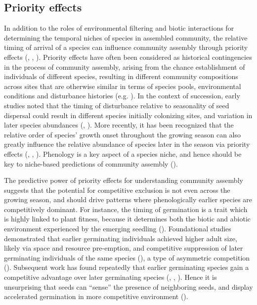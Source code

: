 \documentclass[11pt]{article}
\begin{document}
\subsection*{Priority effects}

In addition to the roles of environmental filtering and biotic interactions for determining the temporal niches of species in assembled community, the relative timing of arrival of a species can influence community assembly through priority effects (\citet{alford1985priority}, \citet{chase2003community}, \citet{fukami2015historical}). Priority effects have often been considered as historical contingencies in the process of community assembly, arising from the chance establishment of individuals of different species, resulting in different community compositions across sites that are otherwise similar in terms of species pools, environmental conditions and disturbance histories (e.g. \citet{diamond1975assembly}). In the context of succession, early studies noted that the timing of disturbance relative to seasonality of seed dispersal could result in different species initially colonizing sites, and variation in later species abundances (\citet{keever1950causes}, \citet{holt1972effect}). More recently, it has been recognized that the relative order of species’ growth onset throughout the growing season can also greatly influence the relative abundance of species later in the season via priority effects (\citet{fukami2015historical}, \citet{wainwright2012seasonal}, \citet{rudolf2019role}).  Phenology is a key aspect of a species niche, and hence should be key to niche-based predictions of community assembly (\citet{vannette2014historical}).

The predictive power of priority effects for understanding community assembly suggests that the potential for competitive exclusion is not even across the growing season, and should drive patterns where phenologically earlier species are competitively dominant. For instance, the timing of germination is a trait which is highly linked to plant fitness, because it determines both the biotic and abiotic environment experienced by the emerging seedling (\citet{donohue2010germination}). Foundational studies demonstrated that earlier germinating individuals achieved higher adult size, likely via space and resource pre-emption, and competitive suppression of later germinating individuals of the same species (\citet{ross1972occupation}),  a type of asymmetric competition (\citet{connolly1996asymmetric}). Subsequent work has found repeatedly that earlier germinating species gain a competitive advantage over later germinating species (\cite{cleland2015priority}, \citet{waterton2016trade}, \citet{blackford2020species}). Hence it is unsurprising that seeds can “sense” the presence of neighboring seeds, and display accelerated germination in more competitive environment (\citet{dyer2000accelerated}).
\end{document}
